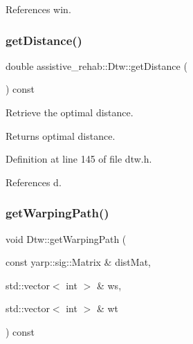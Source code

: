References win.

\mbox{\label{classassistive__rehab_1_1Dtw_ab530a2ea914ddab06899dfc511a13eed}} 
\subsubsection{\texorpdfstring{getDistance()}{getDistance()}}
{\footnotesize\ttfamily double assistive\+\_\+rehab\+::\+Dtw\+::get\+Distance (\begin{DoxyParamCaption}{ }\end{DoxyParamCaption}) const\hspace{0.3cm}{\ttfamily [inline]}}



Retrieve the optimal distance. 

\begin{DoxyReturn}{Returns}
optimal distance. 
\end{DoxyReturn}


Definition at line 145 of file dtw.\+h.


\begin{DoxyCode}{0}

\end{DoxyCode}


References d.

\mbox{\label{classassistive__rehab_1_1Dtw_ab5e7ac2f9658d042c39c0801def854e7}} 
\subsubsection{\texorpdfstring{getWarpingPath()}{getWarpingPath()}}
{\footnotesize\ttfamily void Dtw\+::get\+Warping\+Path (\begin{DoxyParamCaption}\item[{const yarp\+::sig\+::\+Matrix \&}]{dist\+Mat,  }\item[{std\+::vector$<$ int $>$ \&}]{ws,  }\item[{std\+::vector$<$ int $>$ \&}]{wt }\end{DoxyParamCaption}) const\hspace{0.3cm}{\ttfamily [protected]}}



